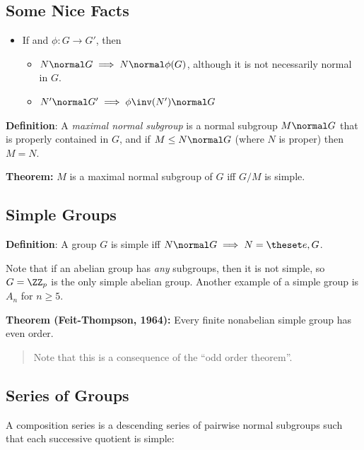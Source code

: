 \hypertarget{some-nice-facts}{%
\subsection{Some Nice Facts}\label{some-nice-facts}}

\begin{itemize}
\tightlist
\item
  If and \(\phi: G\to G'\), then

  \begin{itemize}
  \tightlist
  \item
    \(N \normal G \implies N \normal \phi(G)\), although it is not
    necessarily normal in \(G\).
  \item
    \(N' \normal G' \implies \phi\inv(N') \normal G\)
  \end{itemize}
\end{itemize}

\textbf{Definition}: A \emph{maximal normal subgroup} is a normal
subgroup \(M \normal G\) that is properly contained in \(G\), and if
\(M \leq N \normal G\) (where \(N\) is proper) then \(M = N\).

\textbf{Theorem:} \(M\) is a maximal normal subgroup of \(G\) iff
\(G/M\) is simple.

\hypertarget{simple-groups}{%
\subsection{Simple Groups}\label{simple-groups}}

\textbf{Definition}: A group \(G\) is simple iff
\(N \normal G \implies N = \theset e, G\).

Note that if an abelian group has \emph{any} subgroups, then it is not
simple, so \(G = \ZZ_p\) is the only simple abelian group. Another
example of a simple group is \(A_n\) for \(n\geq 5\).

\textbf{Theorem (Feit-Thompson, 1964):} Every finite nonabelian simple
group has even order.

\begin{quote}
Note that this is a consequence of the ``odd order theorem''.
\end{quote}

\hypertarget{series-of-groups}{%
\subsection{Series of Groups}\label{series-of-groups}}

A composition series is a descending series of pairwise normal subgroups
such that each successive quotient is simple:

